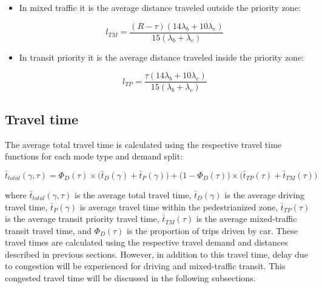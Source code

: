 \documentclass{elsarticle}\usepackage[]{graphicx}\usepackage[]{color}
\begin{document}
    \begin{itemize}
        \item In mixed traffic it is the average distance traveled outside the priority zone:
        
        \begin{equation}
            l_{TM} = \frac{(R-\tau)(14\lambda_b + 10\lambda_c)}{15(\lambda_b + \lambda_c)}
        \end{equation}
            
        \item In transit priority it is the average distance traveled inside the priority zone:
        
        \begin{equation}
            l_{TP} = \frac{\tau (14\lambda_b + 10\lambda_c)}{15(\lambda_b + \lambda_c)}
        \end{equation}
        
    \end{itemize}


\subsection{Travel time}
The average total travel time is calculated using the respective travel time functions for each mode type and demand split: 

\begin{equation}
	\bar{t}_{total}(\gamma,\tau) = \Phi_D(\tau) \times \bigg( \bar{t}_D(\gamma) + \bar{t}_P(\gamma) \bigg) + \bigg(1-\Phi_D(\tau) \bigg) \times \bigg( \bar{t}_{TP}(\tau) + \bar{t}_{TM}(\tau) \bigg)
\end{equation}

\noindent where $\bar{t}_{total}(\gamma,\tau)$ is the average total travel time, $\bar{t}_D(\gamma)$ is the average driving travel time, $\bar{t}_P(\gamma)$ is average travel time within the pedestrianized zone, $\bar{t}_{TP}(\tau)$ is the average transit priority travel time, $\bar{t}_{TM}(\tau)$ is the average mixed-traffic transit travel time, and $\Phi_D(\tau)$ is the proportion of trips driven by car. These travel times are calculated using the respective travel demand and distances described in previous sections. However, in addition to this travel time, delay due to congestion will be experienced for driving and mixed-traffic transit. This congested travel time will be discussed in the following subsections.
\end{document}
